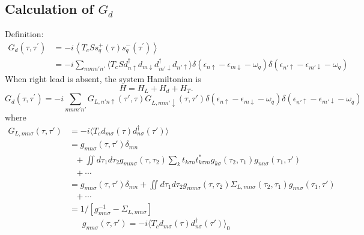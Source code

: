 \documentclass[aps,prb,onecolumn,amssymb,amsmath,superscriptaddress]{revtex4-1}
\begin{document}
\subsection{Calculation of $G_{d}$}
Definition:
\begin{equation}
\begin{split}
G_{d}\left(\tau, \tau^{\prime}\right)&=
-i\left\langle T_{c} S s_{q}^{+}(\tau) s_{q}^{-}\left(\tau^{\prime}\right)\right\rangle \\
&=-i\sum_{mnm'n'}\langle T_{c}S d_{n \uparrow}^{\dagger} d_{m \downarrow} d_{m' \downarrow}^{\dagger} d_{n' \uparrow} \rangle \delta\left(\epsilon_{n \uparrow}-\epsilon_{m \downarrow}-\omega_{q}\right) \delta\left(\epsilon_{n' \uparrow}-\epsilon_{m' \downarrow}-\omega_{q}\right) 
\end{split}
\end{equation}
When right lead is absent, the system Hamiltonian is
\begin{equation}
H = H_{L} + H_{d} + H_{T}.
\end{equation}
\begin{equation}
G_{d}\left(\tau, \tau^{\prime}\right)=-i\sum_{mnm'n'}G_{L,n'n\uparrow}(\tau', \tau) G_{L,mm'\downarrow}(\tau, \tau') \delta\left(\epsilon_{n \uparrow}-\epsilon_{m \downarrow}-\omega_{q}\right) \delta\left(\epsilon_{n' \uparrow}-\epsilon_{m' \downarrow}-\omega_{q}\right)
\end{equation}
where
\begin{equation}
\begin{split}
G_{L,mn\sigma}(\tau, \tau')&= -i\langle T_{c}d_{m\sigma}(\tau) d_{n\sigma}^{\dag}(\tau')\rangle \\
&=g_{mn\sigma}(\tau, \tau')\delta_{mn} \\
&~~~+ \iint d\tau_{1}d\tau_{2} g_{mm\sigma}(\tau, \tau_{2}) \sum_{k} t_{k\sigma n}t_{k\sigma m}^{*} g_{k\sigma}(\tau_{2}, \tau_{1}) g_{nn\sigma}(\tau_{1}, \tau') \\
&~~~ +\cdots \\
&=g_{mn\sigma}(\tau, \tau')\delta_{mn} + \iint d\tau_{1}d\tau_{2} g_{mm\sigma}(\tau, \tau_{2}) \Sigma_{L,mn\sigma}(\tau_{2}, \tau_{1}) g_{nn\sigma}(\tau_{1}, \tau')\\
&~~~+ \cdots \\
&= 1 /\left[g_{mn \sigma}^{-1}-\Sigma_{L,mn \sigma}\right]
\end{split}
\end{equation}
\begin{equation}
g_{mn\sigma}(\tau, \tau') = -i\langle T_{c}d_{m\sigma}(\tau) d_{n\sigma}^{\dag}(\tau')\rangle_{0}
\end{equation}
\end{document}

